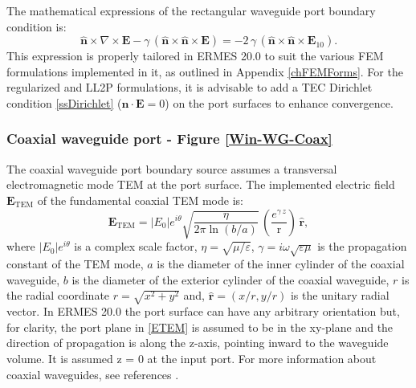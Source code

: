 The mathematical expressions of the rectangular waveguide port boundary condition is:
\begin{equation}\label{RWRCExpanded}
	\mathbf{\hat{n}}\times\nabla\times\mathbf{E} - \gamma\,(\mathbf{\hat{n}}\times\mathbf{\hat{n}}\times\mathbf{E}) = -2\,\gamma\,(\mathbf{\hat{n}}\times\mathbf{\hat{n}}\times\mathbf{E}_{10}).
\end{equation}
This expression is properly tailored in ERMES 20.0 to suit the various FEM formulations implemented in it, as outlined in Appendix \ref{chFEMForms}. For the regularized and LL2P formulations, it is advisable to add a TEC Dirichlet condition \ref{ssDirichlet} ($\mathbf{\hat{n}}\cdot\mathbf{E} = 0$) on the port surfaces to enhance convergence.

\subsubsection{Coaxial waveguide port - Figure \ref{Win-WG-Coax}}\label{bsCoaxPort}

The coaxial waveguide port boundary source assumes a transversal electromagnetic mode TEM at the port surface. The implemented electric field $\mathbf{E}_{\text{TEM}}$ of the fundamental coaxial TEM mode is:
\begin{equation}\label{ETEM}
\mathbf{E}_{\text{TEM}} = |E_{0}|e^{i\theta}\sqrt{\frac{\eta}{2\pi\ln(b/a)}}\,\left(\frac{e^{\gamma\,z}}{\text{r}}\right)\,\mathbf{\hat{r}},
\end{equation}
where $|E_{0}|e^{i\theta}$ is a complex scale factor, $\eta = \sqrt{\mu/\varepsilon}$, $\gamma = i\omega\sqrt{\varepsilon\mu}$ is the propagation constant of the TEM mode, $a$ is the diameter of the inner cylinder of the coaxial waveguide, $b$ is the diameter of the exterior cylinder of the coaxial waveguide, $r$ is the radial coordinate $r = \sqrt{x^2 + y^2}$ and, $\mathbf{\hat{r}} = (x/r, y/r)$ is the unitary radial vector. In ERMES 20.0 the port surface can have any arbitrary orientation but, for clarity, the port plane in \eqref{ETEM} is assumed to be in the xy-plane and the direction of propagation is along the z-axis, pointing inward to the waveguide volume. It is assumed z = 0 at the input port. For more information about coaxial waveguides, see references \cite{Pozar, Balanis}. 

